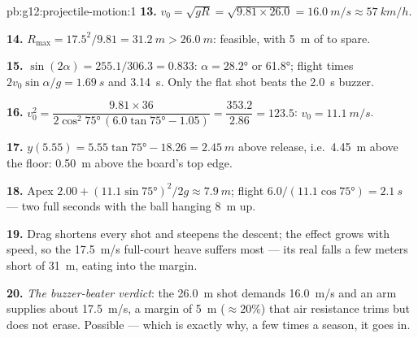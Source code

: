 \begin{solution}{pb:g12:projectile-motion:1}
\textbf{13.} $v_0 = \sqrt{gR} = \sqrt{9.81 \times 26.0} =
\qty{16.0}{m/s} \approx \qty{57}{km/h}$.

\textbf{14.} $R_{\max} = 17.5^2/9.81 = \qty{31.2}{m} >
\qty{26.0}{m}$: feasible, with \qty{5}{m} of  to spare.

\textbf{15.} $\sin(2\alpha) = 255.1/306.3 = 0.833$:
$\alpha = \ang{28.2}$ or \ang{61.8}; flight times
$2v_0\sin\alpha/g = \qty{1.69}{s}$ and \qty{3.14}{s}. Only the flat
shot beats the \qty{2.0}{s} buzzer.

\textbf{16.} $v_0^2 = \dfrac{9.81 \times 36}{2\cos^2\ang{75}\,
(6.0\tan\ang{75} - 1.05)} = \dfrac{353.2}{2.86} = 123.5$:
$v_0 = \qty{11.1}{m/s}$.

\textbf{17.} $y(5.55) = 5.55\tan\ang{75} - 18.26 = \qty{2.45}{m}$
above release, i.e.\ \qty{4.45}{m} above the floor: \qty{0.50}{m}
above the board's top edge.

\textbf{18.} Apex $2.00 + (11.1\sin\ang{75})^2/2g \approx
\qty{7.9}{m}$; flight $6.0/(11.1\cos\ang{75}) = \qty{2.1}{s}$ ---
two full seconds with the ball hanging \qty{8}{m} up.

\textbf{19.} Drag shortens every shot and steepens the descent; the
effect grows with speed, so the \qty{17.5}{m/s} full-court heave
suffers most --- its real  falls a few meters short of
\qty{31}{m}, eating into the margin.

\textbf{20.} \emph{The buzzer-beater verdict}: the \qty{26.0}{m}
shot demands \qty{16.0}{m/s} and an arm supplies about
\qty{17.5}{m/s}, a  margin of \qty{5}{m} ($\approx 20\%$) that
air resistance trims but does not erase. Possible --- which is
exactly why, a few times a season, it goes in.
\end{solution}
